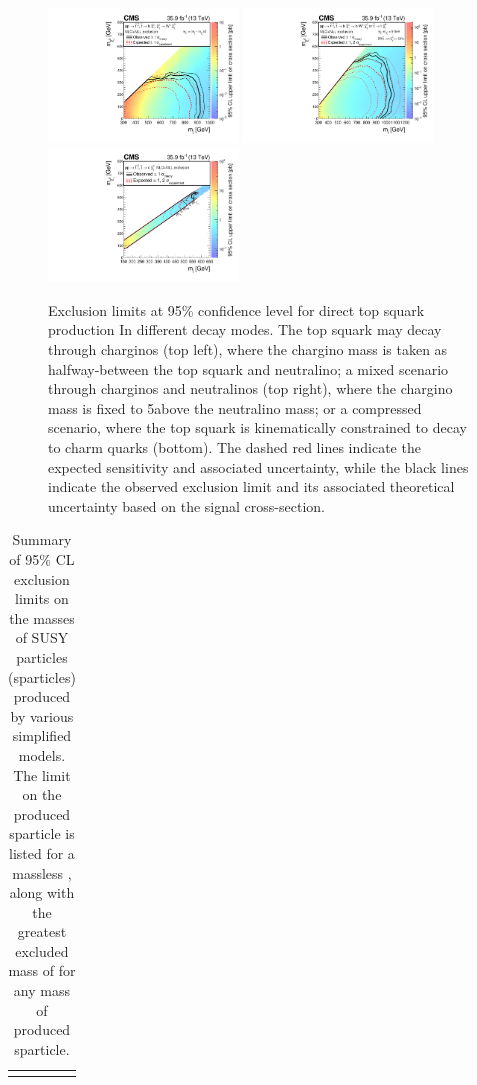 \begin{figure}
	\centering
	\includegraphics[width=0.45\textwidth]{results/figs/interpretations/T2bW_35p9ifb_Moriond2017_Mar07_XSEC}
	\includegraphics[width=0.45\textwidth]{results/figs/interpretations/T2bt_35p9ifb_Moriond2017_Mar07_XSEC}
	\includegraphics[width=0.45\textwidth]{results/figs/interpretations/T2cc_35p9ifb_Moriond2017_Mar07_XSEC}
	\caption{Exclusion limits at 95\% confidence level for direct top squark production In different decay modes. The top squark may decay through charginos (top left), where the chargino mass is taken as halfway-between the top squark and neutralino; a mixed scenario through charginos and neutralinos (top right), where the chargino mass is fixed to 5\GeV above the neutralino mass; or a compressed scenario, where the top squark is kinematically constrained to decay to charm quarks (bottom). The dashed red lines indicate the expected sensitivity and associated uncertainty, while the black lines indicate the observed exclusion limit and its associated theoretical uncertainty based on the signal cross-section.}
	\label{fig:limitsStop}
\end{figure}

\begin{table}
	\centering
	\begin{tabular}[]{l c r}
		\fm{Summary table of masses excluded} 
	\end{tabular}
	\caption{Summary of 95\% CL exclusion limits on the masses of SUSY particles (sparticles) produced by various simplified models. The limit on the produced sparticle is listed for a massless \lsp, along with the greatest excluded mass of \lsp for any mass of produced sparticle.}
	\label{tbl:limits}
\end{table}

